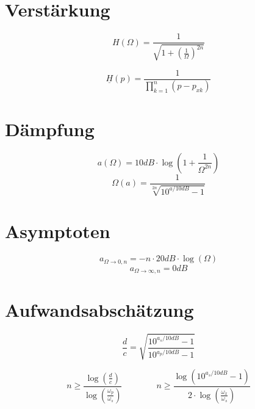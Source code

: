 \documentclass[a4paper, 12pt]{report}
\begin{document}
\section*{Verstärkung}
	\vspace{-0.3cm}
    \begin{minipage}[t]{0.5\textwidth}
	    \[ H(\Omega) = \frac{1}{\sqrt{1 + \left(\frac{1}{\Omega}\right)^{2n}}} \]
    \end{minipage}
    \begin{minipage}[t]{0.5\textwidth}
	    \[ \underline{H}(p) = \frac{1}{\prod_{k=1}^n \left(p - p_{xk}\right)} \]
    \end{minipage}
    
    \vspace{0.5cm}
    
	\begin{minipage}[t]{0.5\textwidth}
  		\section*{Dämpfung}
		\[ a(\Omega) = 10dB \cdot \log{\left(1 + \frac{1}{\Omega^{2n}}\right)} \]
		\[ \Omega(a) = \frac{1}{\sqrt[2n]{10^{a / 10dB} - 1}} \]
	\end{minipage}
	\begin{minipage}[t]{0.5\textwidth}
		 \section*{Asymptoten}
		  \[ a_{\Omega\rightarrow 0,n} = -n \cdot 20dB \cdot \log{(\Omega)} \]
		  \[ a_{\Omega\rightarrow \infty,n} = 0dB \]
	\end{minipage}
	
   	
\section*{Aufwandsabschätzung}
	\vspace{-0.5cm}
   	\begin{minipage}[t]{0.5\textwidth}
		\[ \frac{d}{c} = \sqrt{\frac{10^{a_s/10dB} - 1}{10^{a_p/10dB} - 1}} \]
   	\end{minipage}
   	\begin{minipage}[t]{0.5\textwidth}
   		\vspace{-0.5cm}
		\[ n \ge \frac{\log{\left(\frac{d}{c}\right)}}{\log{\left(\frac{\omega_p}{\omega_s}\right)}} \qquad \qquad n \ge \frac{\log{\left(10^{a_s/10dB}-1\right)}}{2 \cdot \log{\left(\frac{\omega_x}{\omega_s}\right)}}\]
   	\end{minipage}
\end{document}
